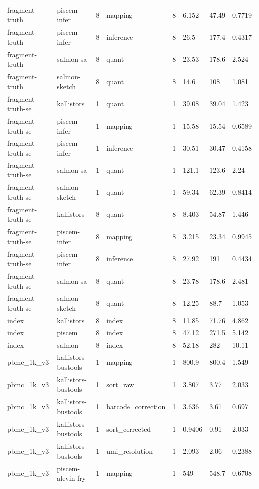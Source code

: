 \begin{tabular}{llllllll}
fragment-truth & piscem-infer & 8 & mapping & 8 & 6.152 & 47.49 & 0.7719 \\
fragment-truth & piscem-infer & 8 & inference & 8 & 26.5 & 177.4 & 0.4317 \\
fragment-truth & salmon-sa & 8 & quant & 8 & 23.53 & 178.6 & 2.524 \\
fragment-truth & salmon-sketch & 8 & quant & 8 & 14.6 & 108 & 1.081 \\
fragment-truth-se & kallistors & 1 & quant & 1 & 39.08 & 39.04 & 1.423 \\
fragment-truth-se & piscem-infer & 1 & mapping & 1 & 15.58 & 15.54 & 0.6589 \\
fragment-truth-se & piscem-infer & 1 & inference & 1 & 30.51 & 30.47 & 0.4158 \\
fragment-truth-se & salmon-sa & 1 & quant & 1 & 121.1 & 123.6 & 2.24 \\
fragment-truth-se & salmon-sketch & 1 & quant & 1 & 59.34 & 62.39 & 0.8414 \\
fragment-truth-se & kallistors & 8 & quant & 8 & 8.403 & 54.87 & 1.446 \\
fragment-truth-se & piscem-infer & 8 & mapping & 8 & 3.215 & 23.34 & 0.9945 \\
fragment-truth-se & piscem-infer & 8 & inference & 8 & 27.92 & 191 & 0.4434 \\
fragment-truth-se & salmon-sa & 8 & quant & 8 & 23.78 & 178.6 & 2.481 \\
fragment-truth-se & salmon-sketch & 8 & quant & 8 & 12.25 & 88.7 & 1.053 \\
index & kallistors & 8 & index & 8 & 11.85 & 71.76 & 4.862 \\
index & piscem & 8 & index & 8 & 47.12 & 271.5 & 5.142 \\
index & salmon & 8 & index & 8 & 52.18 & 282 & 10.11 \\
pbmc\_1k\_v3 & kallistors-bustools & 1 & mapping & 1 & 800.9 & 800.4 & 1.549 \\
pbmc\_1k\_v3 & kallistors-bustools & 1 & sort\_raw & 1 & 3.807 & 3.77 & 2.033 \\
pbmc\_1k\_v3 & kallistors-bustools & 1 & barcode\_correction & 1 & 3.636 & 3.61 & 0.697 \\
pbmc\_1k\_v3 & kallistors-bustools & 1 & sort\_corrected & 1 & 0.9406 & 0.91 & 2.033 \\
pbmc\_1k\_v3 & kallistors-bustools & 1 & umi\_resolution & 1 & 2.093 & 2.06 & 0.2388 \\
pbmc\_1k\_v3 & piscem-alevin-fry & 1 & mapping & 1 & 549 & 548.7 & 0.6708 \\

\end{tabular}
